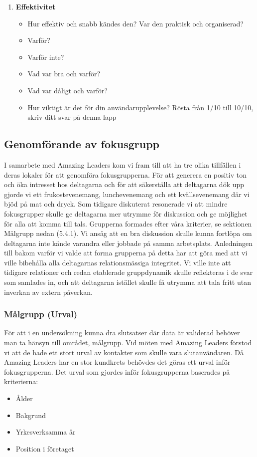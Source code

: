 \begin{enumerate}
\item \textbf{Effektivitet}
\begin{itemize}  
\item Hur effektiv och snabb kändes den? Var den praktisk och organiserad? 
\item Varför?
\item Varför inte?
\item Vad var bra och varför? 
\item Vad var dåligt och varför?
\item Hur viktigt är det för din användarupplevelse? Rösta från 1/10 till 10/10, skriv ditt svar på denna lapp
\end{itemize}
\end{enumerate}

\subsection{Genomförande av fokusgrupp}
I samarbete med Amazing Leaders kom vi fram till att ha tre olika tillfällen i deras lokaler för att genomföra fokusgrupperna. För att generera en positiv ton och öka intresset hos deltagarna och för att säkerställa att deltagarna dök upp gjorde vi ett frukostevenemang, lunchevenemang och ett kvällsevenemang där vi bjöd på mat och dryck. Som tidigare diskuterat resonerade vi att mindre fokusgrupper skulle ge deltagarna mer utrymme för diskussion och ge möjlighet för alla att komma till tals. Grupperna formades efter våra kriterier, se sektionen Målgrupp nedan (5.4.1). Vi ansåg att en bra diskussion skulle kunna fortlöpa om deltagarna inte kände varandra eller jobbade på samma arbetsplats. Anledningen till bakom varför vi valde att forma grupperna på detta har att göra med att vi ville bibehålla alla deltagarnas relationsmässiga integritet. Vi ville inte att tidigare relationer och redan etablerade gruppdynamik skulle reflekteras i de svar som samlades in, och att deltagarna istället skulle få utrymma att tala fritt utan inverkan av extern påverkan. 
\newline


\subsubsection{Målgrupp (Urval)}
\label{malgrupp}
För att i en undersökning kunna dra slutsatser där data är validerad behöver man ta hänsyn till området, målgrupp\cite{Gualtieri2009BestDesign}. Vid möten med Amazing Leaders förstod vi att de hade ett stort urval av kontakter som skulle vara slutanvändaren. Då Amazing Leaders har en stor kundkrets behövdes det göras ett urval inför fokusgrupperna. Det urval som gjordes inför fokusgrupperna baserades på kriterierna: 
\begin{itemize}
\item Ålder
\item Bakgrund 
\item Yrkesverksamma år
\item Position i företaget 
\end{itemize}

